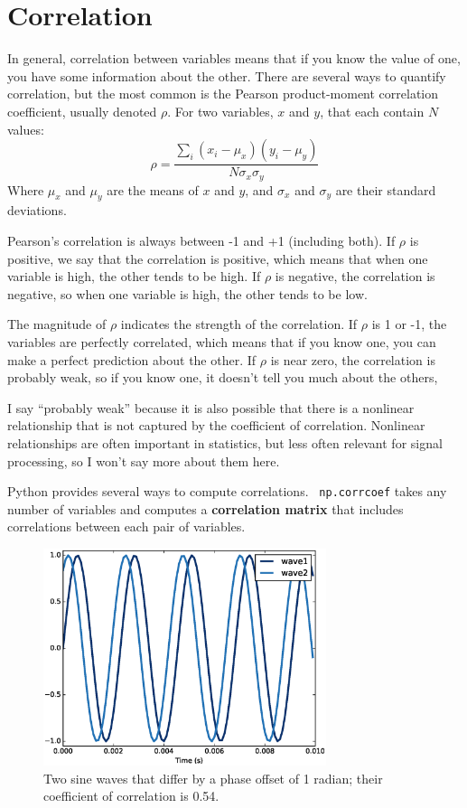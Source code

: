 \documentclass[12pt]{book}
\begin{document}
\section{Correlation}

In general, correlation between variables means that if you know the
value of one, you have some information about the other.  There are
several ways to quantify correlation, but the most common is the
Pearson product-moment correlation coefficient, usually denoted
$\rho$.  For two variables, $x$ and $y$, that each contain $N$ values:
%
\[ \rho = \frac{ \sum_i (x_i - \mu_x) (y_i - \mu_y)}{N \sigma_x \sigma_y} \]
%
Where $\mu_x$ and $\mu_y$ are the means of $x$ and $y$, and
$\sigma_x$ and $\sigma_y$ are their standard deviations.

Pearson's correlation is always between -1 and +1 (including both).
If $\rho$ is positive, we say that the correlation is positive,
which means that when one variable is high, the other tends to be
high.  If $\rho$ is negative, the correlation is negative, so
when one variable is high, the other tends to be low.

The magnitude of $\rho$ indicates the strength of the correlation.  If
$\rho$ is 1 or -1, the variables are perfectly correlated, which means
that if you know one, you can make a perfect prediction about the
other.  If $\rho$ is near zero, the correlation is probably weak, so
if you know one, it doesn't tell you much about the others,

I say ``probably weak'' because it is also possible that there is
a nonlinear relationship that is not captured by the coefficient
of correlation.  Nonlinear relationships are often important in
statistics, but less often relevant for signal processing, so I
won't say more about them here.

Python provides several ways to compute correlations.  {\tt
  np.corrcoef} takes any number of variables and computes a {\bf
  correlation matrix} that includes correlations between each pair of
variables.

\begin{figure}
\centerline{\includegraphics[height=2.5in]{figs/autocorr1.eps}}
\caption{Two sine waves that differ by a phase offset of 1 radian;
their coefficient of correlation is 0.54.}
\label{fig.autocorr1}
\end{figure}
\end{document}
